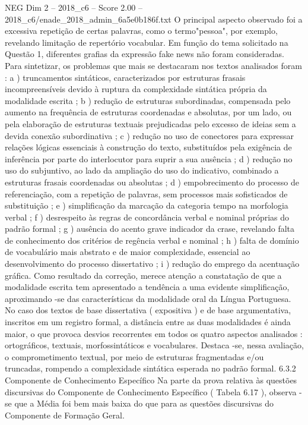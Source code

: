 \begin{textsample}{NEG Dim 2 – 2018\_c6 – Score 2.00 – 2018\_c6/enade\_2018\_admin\_6a5e0b186f.txt}
O principal aspecto observado foi a excessiva repetição de certas palavras, como o termo"pessoa", por exemplo, revelando limitação de repertório vocabular.
Em função do tema solicitado na Questão 1, diferentes grafias da expressão fake news não foram consideradas.
Para sintetizar, os problemas que mais se destacaram nos textos analisados foram : a ) truncamentos sintáticos, caracterizados por estruturas frasais incompreensíveis devido à ruptura da complexidade sintática própria da modalidade escrita ; b ) redução de estruturas subordinadas, compensada pelo aumento na frequência de estruturas coordenadas e absolutas, por um lado, ou pela elaboração de estruturas textuais prejudicadas pelo excesso de ideias sem a devida conexão subordinativa ; c ) redução no uso de conectores para expressar relações lógicas essenciais à construção do texto, substituídos pela exigência de inferência por parte do interlocutor para suprir a sua ausência ; d ) redução no uso do subjuntivo, ao lado da ampliação do uso do indicativo, combinado a estruturas frasais coordenadas ou absolutas ; d ) empobrecimento do processo de referenciação, com a repetição de palavras, sem processos mais sofisticados de substituição ; e ) simplificação da marcação da categoria tempo na morfologia verbal ; f ) desrespeito às regras de concordância verbal e nominal próprias do padrão formal ; g ) ausência do acento grave indicador da crase, revelando falta de conhecimento dos critérios de regência verbal e nominal ; h ) falta de domínio de vocabulário mais abstrato e de maior complexidade, essencial ao desenvolvimento do processo dissertativo ; i ) redução do emprego da acentuação gráfica.
Como resultado da correção, merece atenção a constatação de que a modalidade escrita tem apresentado a tendência a uma evidente simplificação, aproximando -se das características da modalidade oral da Língua Portuguesa.
No caso dos textos de base dissertativa ( expositiva ) e de base argumentativa, inscritos em um registro formal, a distância entre as duas modalidades é ainda maior, o que provoca desvios recorrentes em todos os quatro aspectos analisados : ortográficos, textuais, morfossintáticos e vocabulares.
Destaca -se, nessa avaliação, o comprometimento textual, por meio de estruturas fragmentadas e/ou truncadas, rompendo a complexidade sintática esperada no padrão formal. 6.3.2 Componente de Conhecimento Específico Na parte da prova relativa às questões discursivas do Componente de Conhecimento Específico ( Tabela 6.17 ), observa -se que a Média foi bem mais baixa do que para as questões discursivas do Componente de Formação Geral.

\end{textsample}
